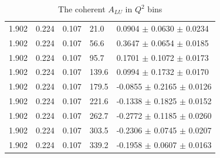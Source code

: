 \begin{table}[!h]
\begin{center}
\begin{tabular}{||l|l|l|l|l||}
  \hline                                                                    
  1.902 & 0.224 & 0.107 &  21.0  &  0.0904   $\pm$ 0.0630   $\pm$  0.0234 \\
  1.902 & 0.224 & 0.107 &  56.6  &  0.3647   $\pm$ 0.0654   $\pm$  0.0185 \\
  1.902 & 0.224 & 0.107 &  95.7  &  0.1701   $\pm$ 0.1072   $\pm$  0.0173 \\
  1.902 & 0.224 & 0.107 &  139.6 &  0.0994   $\pm$ 0.1732   $\pm$  0.0170 \\
  1.902 & 0.224 & 0.107 &  179.5 & -0.0855   $\pm$ 0.2165   $\pm$  0.0126 \\
  1.902 & 0.224 & 0.107 &  221.6 & -0.1338   $\pm$ 0.1825   $\pm$  0.0152 \\
  1.902 & 0.224 & 0.107 &  262.7 & -0.2772   $\pm$ 0.1185   $\pm$  0.0260 \\
  1.902 & 0.224 & 0.107 &  303.5 & -0.2306   $\pm$ 0.0745   $\pm$  0.0207 \\
  1.902 & 0.224 & 0.107 &  339.2 & -0.1958   $\pm$ 0.0607   $\pm$  0.0163 \\
         \hline \hline
      \end{tabular}
      \caption{ The coherent $A_{LU}$ in $Q^2$ bins}
      \label{table:Coh_Q2_BSA}
   \end{center}
\end{table}                    

